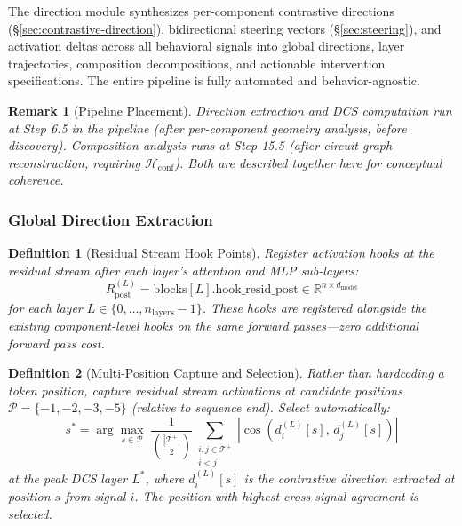 \documentclass[11pt]{article}
\newtheorem{definition}{Definition}[section]
\newtheorem{remark}{Remark}[section]
\begin{document}
The direction module synthesizes per-component contrastive directions (\S\ref{sec:contrastive-direction}), bidirectional steering vectors (\S\ref{sec:steering}), and activation deltas across all behavioral signals into global directions, layer trajectories, composition decompositions, and actionable intervention specifications. The entire pipeline is fully automated and behavior-agnostic.

\begin{remark}[Pipeline Placement]
\label{rem:direction-pipeline}
Direction extraction and DCS computation run at Step 6.5 in the pipeline (after per-component geometry analysis, before discovery). Composition analysis runs at Step 15.5 (after circuit graph reconstruction, requiring $\mathcal{H}_{\text{conf}}$). Both are described together here for conceptual coherence.
\end{remark}

\subsubsection{Global Direction Extraction}
\label{sec:direction-synthesis}
\label{sec:global-direction-extraction}

\begin{definition}[Residual Stream Hook Points]
\label{def:resid-hooks}
Register activation hooks at the residual stream after each layer's attention and MLP sub-layers:
\begin{equation}
R^{(L)}_{\text{post}} = \text{blocks}[L].\text{hook\_resid\_post} \in \mathbb{R}^{n \times d_{\text{model}}}
\end{equation}
for each layer $L \in \{0, \ldots, n_{\text{layers}} - 1\}$. These hooks are registered alongside the existing component-level hooks on the \emph{same forward passes}---zero additional forward pass cost.
\end{definition}

\begin{definition}[Multi-Position Capture and Selection]
\label{def:position-selection}
Rather than hardcoding a token position, capture residual stream activations at candidate positions $\mathcal{P} = \{-1, -2, -3, -5\}$ (relative to sequence end). Select automatically:
\begin{equation}
s^* = \arg\max_{s \in \mathcal{P}} \; \frac{1}{\binom{|\mathcal{T}^+|}{2}} \sum_{\substack{i,j \in \mathcal{T}^+ \\ i < j}} |\cos(d^{(L)}_i[s],\, d^{(L)}_j[s])|
\end{equation}
at the peak DCS layer $L^*$, where $d^{(L)}_i[s]$ is the contrastive direction extracted at position $s$ from signal $i$. The position with highest cross-signal agreement is selected.
\end{definition}
\end{document}
